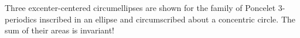 Three excenter-centered circumellipses are shown for the family of Poncelet 3-periodics inscribed in an ellipse and circumscribed about a concentric circle. The sum of their areas is invariant!